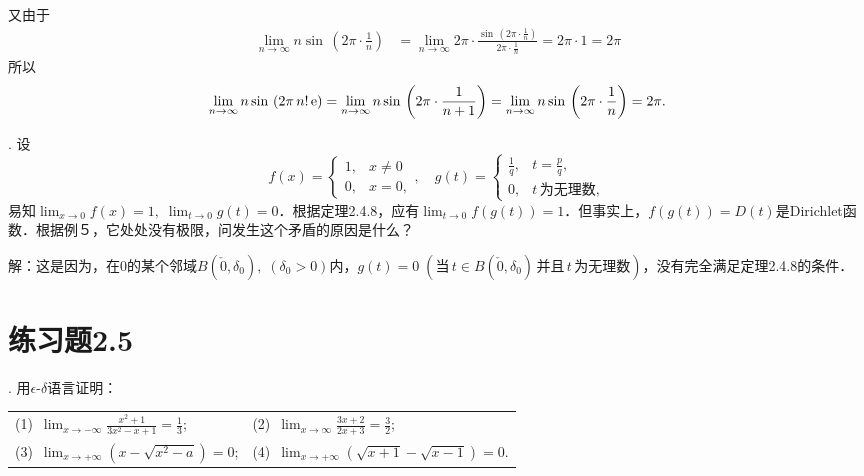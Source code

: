 又由于
\begin{align}
    \lim_{n \to \infty} n \sin \, \left(2 \pi \cdot \displaystyle\frac{1}{n}\right) &= \lim_{n \to \infty} 2 \pi \cdot \displaystyle\frac{\sin \, \left(2\pi \cdot \displaystyle\frac{1}{n}\right)}{2 \pi \cdot \displaystyle\frac{1}{n}} = 2 \pi \cdot 1 = 2 \pi
\end{align}
所以
\begin{equation}
    \lim_{n \to \infty} n \sin \, \left(2 \pi \, n! \, \mathrm{e} \right) = \lim_{n \to \infty} n \sin \, \left(2 \pi \cdot \displaystyle\frac{1}{n+1}\right) = \lim_{n \to \infty} n \sin \, \left(2 \pi \cdot \displaystyle\frac{1}{n}\right) = 2 \pi .
\end{equation}

. 设
\begin{equation}
    f(x) = \begin{cases}
        1, & x \neq 0 \\
        0, & x = 0,
    \end{cases}, \quad g(t) = \begin{cases}
        \displaystyle\frac{1}{q}, & t = \displaystyle\frac{p}{q}, \\
        0, & t \, \text{为无理数},
    \end{cases}
\end{equation}
易知$\displaystyle\lim_{x \to 0} f(x) = 1, \; \displaystyle\lim_{t \to 0} g(t) = 0$．根据定理2.4.8，应有$\displaystyle\lim_{t \to 0} f(g(t)) = 1$．但事实上，$f(g(t)) = D(t)$是Dirichlet函数．根据例５，它处处没有极限，问发生这个矛盾的原因是什么？

\noindent 解：这是因为，在$0$的某个邻域$B(\check{0}, \delta_0), \; (\delta_0 > 0)$内，$g(t) = 0 \; (\text{当} \, t \in B(\check{0}, \delta_0) \, \text{并且} \, t \, \text{为无理数})$，没有完全满足定理2.4.8的条件．

\section*{练习题2.5}

. 用$\epsilon$-$\delta$语言证明：
\begin{table}[H]
    \centering
    \begin{tabularx}{\textwidth} {  >{\raggedright\arraybackslash}X >{\raggedright\arraybackslash}X  }
       (1)~$\displaystyle\lim_{x \to -\infty} \displaystyle\frac{x^2+1}{3x^2-x+1}=\displaystyle\frac{1}{3}$; & (2)~$\displaystyle\lim_{x \to \infty} \displaystyle\frac{3x+2}{2x+3} = \displaystyle\frac{3}{2}$; \\ [1em]
       (3)~$\displaystyle\lim_{x \to +\infty} (x - \sqrt{x^2-a}) = 0$; & (4)~$\displaystyle\lim_{x \to +\infty} (\sqrt{x+1}-\sqrt{x-1}) = 0$.
    \end{tabularx}
\end{table}

